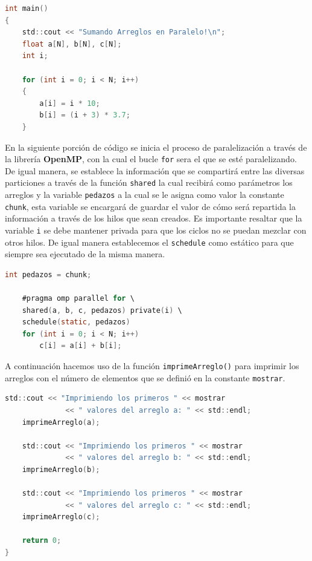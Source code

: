 \documentclass[12pt,a4paper]{article}
\begin{document}
\begin{lstlisting}[language=C, numbers=none]
int main()
{
    std::cout << "Sumando Arreglos en Paralelo!\n";
    float a[N], b[N], c[N];
    int i;

    for (int i = 0; i < N; i++)
    {
        a[i] = i * 10;
        b[i] = (i + 3) * 3.7;
    }
\end{lstlisting}

\vspace{1em}

En la siguiente porción de código se inicia el proceso de paralelización a través de la librería \textbf{OpenMP}, con la cual el bucle \texttt{for} sera el que se esté paralelizando. De igual manera, se establece la información que se compartirá entre las diversas particiones a través de la función \texttt{shared} la cual recibirá como parámetros los arreglos y la variable \texttt{pedazos} a la cual se le asigna como valor la constante \texttt{chunk}, esta variable se encargará de guardar el valor de cómo será repartida la información a través de los hilos que sean creados. Es importante resaltar que la variable \texttt{i} se debe mantener privada para que los ciclos no se puedan mezclar con otros hilos. De igual manera establecemos el \texttt{schedule} como estático para que siempre sea ejecutado de la misma manera.

\begin{lstlisting}[language=C, numbers=none]
    int pedazos = chunk;

    #pragma omp parallel for \
    shared(a, b, c, pedazos) private(i) \
    schedule(static, pedazos)
    for (int i = 0; i < N; i++)
        c[i] = a[i] + b[i];
\end{lstlisting}

\vspace{1em}

A continuación hacemos uso de la función \texttt{imprimeArreglo()} para imprimir los arreglos con el número de elementos que se definió en la constante \texttt{mostrar}.

\begin{lstlisting}[language=C, numbers=none]
    std::cout << "Imprimiendo los primeros " << mostrar 
              << " valores del arreglo a: " << std::endl;
    imprimeArreglo(a);

    std::cout << "Imprimiendo los primeros " << mostrar 
              << " valores del arreglo b: " << std::endl;
    imprimeArreglo(b);

    std::cout << "Imprimiendo los primeros " << mostrar 
              << " valores del arreglo c: " << std::endl;
    imprimeArreglo(c);

    return 0;
}
\end{lstlisting}
\end{document}
